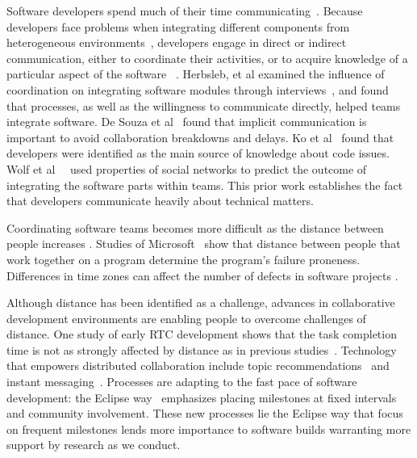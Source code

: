 

Software developers spend much of their time
communicating~\cite{perry94}. Because developers face
problems when integrating different components from heterogeneous environments~\cite{redmiles2007:continuous},
developers engage in direct or indirect
communication, either to coordinate their activities, or to acquire knowledge of
a particular aspect of the software ~\cite{nakakoji2010:rdc}.
Herbsleb, et al examined the influence of coordination on integrating software
modules through interviews~\cite{herbsleb1999:architectures}, and found that
processes, as well as the willingness to communicate directly, helped teams
integrate software. De Souza et al~\cite{desouza2007:awarenessnetwork} found that implicit
communication is important to avoid collaboration breakdowns and delays. Ko et al~\cite{ko:icse:2007} found that developers were identified as the main source of knowledge about code issues.
Wolf et al~~\cite{wolf:icse:2009} used properties of social networks to predict the outcome of integrating the software parts within teams.
This prior work establishes the fact that developers communicate heavily about technical matters.

Coordinating software teams becomes more difficult as the distance between people increases \cite{herbsleb:icse:2001}.
Studies of Microsoft~\cite{bird2009:dds_quality,nagappan:icse:2008}
show that distance between people that work together on a
program determine the program's failure proneness.
Differences in time zones can affect the number of defects in software projects \cite{cataldo2009:quality}.

Although distance has been identified as a challenge, advances in collaborative
development environments are enabling people to overcome challenges of distance.
One study of early RTC development
shows that the task completion time is not as strongly affected by distance as in previous studies~\cite{Nguyen:2008Distance}. Technology that empowers distributed collaboration include topic recommendations~\cite{carter2004} and instant messaging~\cite{niinimaki2008}. Processes are adapting to the fast pace of software development: the Eclipse way~\cite{frost:ieeesoftware:2007} emphasizes placing milestones at fixed intervals and community involvement.
These new processes lie the Eclipse way that focus on frequent milestones lends more importance to software builds warranting more support by research as we conduct.

